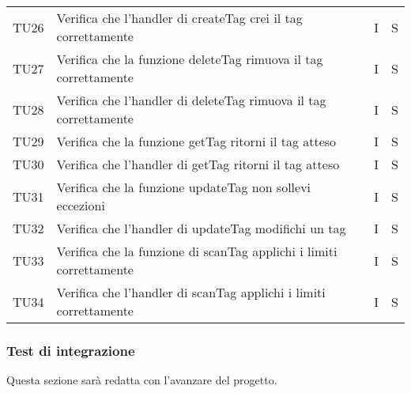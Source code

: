 \begin{center}
\begin{longtable}[!h]{p{45px} p{255px} p{35px} p{35px}}
        TU26          & Verifica che l'handler di createTag crei il tag correttamente                    & I              & S              \\
        TU27          & Verifica che la funzione deleteTag rimuova il tag correttamente                  & I              & S              \\
        TU28          & Verifica che l'handler di deleteTag rimuova il tag correttamente                 & I              & S              \\
        TU29          & Verifica che la funzione getTag ritorni il tag atteso                            & I              & S              \\
        TU30          & Verifica che l'handler di getTag ritorni il tag atteso                           & I              & S              \\
        TU31          & Verifica che la funzione updateTag non sollevi eccezioni                         & I              & S              \\
        TU32          & Verifica che l'handler di updateTag modifichi un tag                             & I              & S              \\
        TU33          & Verifica che la funzione di scanTag applichi i limiti correttamente              & I              & S              \\
        TU34          & Verifica che l'handler di scanTag applichi i limiti correttamente                & I              & S              \\
    \end{longtable}
\end{center}

\subsubsection{Test di integrazione}
Questa sezione sarà redatta con l'avanzare del progetto.
\pagebreak
